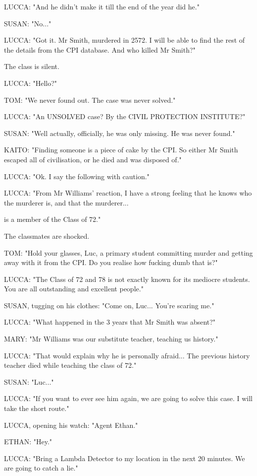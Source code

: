 \documentclass[11pt]{article}
\begin{document}
LUCCA: "And he didn't make it till the end of the year did he."

SUSAN: "No..."

LUCCA: "Got it. Mr Smith, murdered in 2572. 
I will be able to find the rest of the details from the CPI database.
And who killed Mr Smith?"

The class is silent.

LUCCA: "Hello?"

TOM: "We never found out. The case was never solved."

LUCCA: "An UNSOLVED case? 
By the CIVIL PROTECTION INSTITUTE?"

SUSAN: "Well actually, officially, he was only missing.
He was never found."

KAITO: "Finding someone is a piece of cake by the CPI.
So either Mr Smith escaped all of civilisation, or he died and was disposed of."

LUCCA: "Ok. 
I say the following with caution."

LUCCA: "From Mr Williams' reaction, I have a strong feeling that he knows who the murderer is, and that the murderer...

is a member of the Class of 72."



The classmates are shocked.

TOM: "Hold your glasses, Luc, a primary student committing murder and getting away with it from the CPI. Do you realise how fucking dumb that is?"

LUCCA: "The Class of 72 and 78 is not exactly known for its mediocre students.
You are all outstanding and excellent people."

SUSAN, tugging on his clothes: "Come on, Luc... You're scaring me."

LUCCA: "What happened in the 3 years that Mr Smith was absent?"

MARY: "Mr Williams was our substitute teacher, teaching us history."

LUCCA: "That would explain why he is personally afraid... The previous history teacher died while teaching the class of 72."

SUSAN: "Luc..."

LUCCA: "If you want to ever see him again, we are going to solve this case.
I will take the short route."

LUCCA, opening his watch: "Agent Ethan."

ETHAN: "Hey."

LUCCA: "Bring a Lambda Detector to my location in the next 20 minutes. 
We are going to catch a lie."
\end{document}

